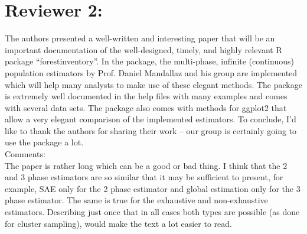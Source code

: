 \documentclass{article}
\begin{document}
\section*{Reviewer 2:}

The authors presented a well-written and interesting paper that will be an important documentation of the well-designed, timely, and highly relevant R package “forestinventory”. In the package, the multi-phase, infinite
(continuous) population estimators by Prof. Daniel Mandallaz and his group are implemented which will help many analysts to make use of these elegant methods. The package is extremely well documented in the help files with many examples and comes with several data sets. The package also comes with methods for ggplot2 that allow a very elegant comparison of the implemented estimators. To conclude, I’d like to thank the authors for sharing their work -- our group is certainly going to use the package a lot.\\


Comments:\\

The paper is rather long which can be a good or bad thing. I think that the 2 and 3 phase estimators are so similar that it may be sufficient to present, for example, SAE only for the 2 phase estimator and global estimation only for the 3 phase estimator. The same is true for the exhaustive and non-exhaustive estimators. Describing just once that in all cases both types are possible (as done for cluster sampling), would make the text a lot easier to read. \\
\\
 \\
\end{document}
